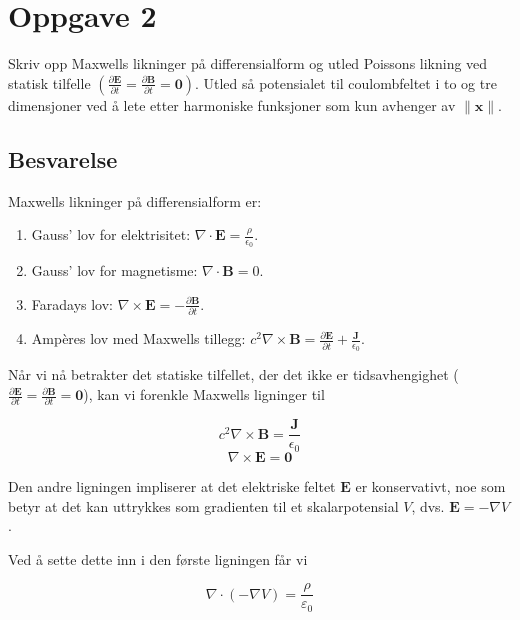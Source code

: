 \section{Oppgave 2}

Skriv opp Maxwells likninger på differensialform og utled Poissons likning ved statisk tilfelle $ \left(\frac{\partial \mathbf{E}}{\partial t}=\frac{\partial \mathbf{B}}{\partial t}=\mathbf{0}\right) $. Utled så potensialet til coulombfeltet i to og tre dimensjoner ved å lete etter harmoniske funksjoner som kun avhenger av $ \|\mathbf{x}\| $.

\subsection*{Besvarelse}

Maxwells likninger på differensialform er:

\begin{enumerate}
\item Gauss' lov for elektrisitet: $\nabla \cdot \mathbf{E} = \frac{\rho}{\epsilon_0}$.
\item Gauss' lov for magnetisme: $\nabla \cdot \mathbf{B} = 0$.
\item Faradays lov: $\nabla \times \mathbf{E} = -\frac{\partial \mathbf{B}}{\partial t}$.
\item Ampères lov med Maxwells tillegg: $c^2 \nabla \times \mathbf{B} = \frac{\partial \mathbf{E}}{\partial t} + \frac{\mathbf{J}}{\epsilon_0}$.
\end{enumerate}


Når vi nå betrakter det statiske tilfellet, der det ikke er tidsavhengighet ($\frac{\partial \mathbf{E}}{\partial t}=\frac{\partial \mathbf{B}}{\partial t}=\mathbf{0}$), kan vi forenkle Maxwells ligninger til

\begin{equation*}
    c^2 \nabla \times \mathbf{B} = \frac{\mathbf{J}}{\epsilon_0}
\end{equation*}
\begin{equation*}
\nabla \times \mathbf{E} = \mathbf{0}
\end{equation*}

Den andre ligningen impliserer at det elektriske feltet $\mathbf{E}$ er konservativt, noe som betyr at det kan uttrykkes som gradienten til et skalarpotensial $V$, dvs. $\mathbf{E} = - \nabla V$.

Ved å sette dette inn i den første ligningen får vi

\begin{equation*}
\nabla \cdot (-\nabla V) = \frac{\rho}{\varepsilon_0}
\end{equation*}

